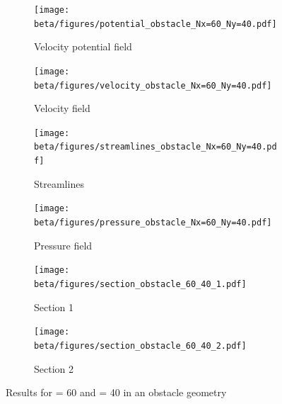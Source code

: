 \begin{figure}[htbp]
      \centering
      \begin{subfigure}{.45\textwidth}
            \texttt{[image: beta/figures/potential\_obstacle\_Nx=60\_Ny=40.pdf]}
            \caption{Velocity potential field}
      \end{subfigure}
      \begin{subfigure}{.45\textwidth}
            \texttt{[image: beta/figures/velocity\_obstacle\_Nx=60\_Ny=40.pdf]}
            \caption{Velocity field}
      \end{subfigure}

      \centering
      \begin{subfigure}{.45\textwidth}
            \texttt{[image: beta/figures/streamlines\_obstacle\_Nx=60\_Ny=40.pdf]}
            \caption{Streamlines}
      \end{subfigure}
      \begin{subfigure}{.45\textwidth}
            \texttt{[image: beta/figures/pressure\_obstacle\_Nx=60\_Ny=40.pdf]}
            \caption{Pressure field}
      \end{subfigure}

      \begin{subfigure}{.45\textwidth}
            \texttt{[image: beta/figures/section\_obstacle\_60\_40\_1.pdf]}
            \caption{Section 1}
      \end{subfigure}
      \begin{subfigure}{.45\textwidth}
            \texttt{[image: beta/figures/section\_obstacle\_60\_40\_2.pdf]}
            \caption{Section 2}
      \end{subfigure}
      \caption{Results for  = \num{60} and  = \num{40} in an obstacle geometry}
\end{figure}